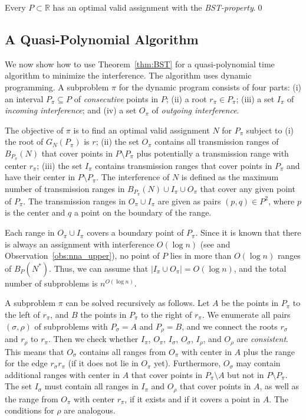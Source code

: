 \documentclass[envcountsect,envcountsame,runningheads,a4paper]{llncs}
\newcommand\R{{\mathbb R}}
\begin{document}
\begin{theorem}\label{thm:BST}
Every $P \subset \R$ has an optimal valid assignment
with the \emph{BST-property}.\qed
\end{theorem}

\subsection{A Quasi-Polynomial Algorithm}\label{sec:qalgo}

We now show how to use Theorem~\ref{thm:BST} for
a quasi-polynomial time algorithm to minimize the
interference. The algorithm uses dynamic
programming. A subproblem $\pi$ for the dynamic program consists of four
parts: (i) an interval $P_\pi \subseteq P$ of \emph{consecutive} points
in $P$;
(ii) a root $r_\pi \in P_\pi$; (iii) a set
$I_\pi$ of \emph{incoming interference}; and (iv) a set $O_\pi$
of \emph{outgoing interference}.

The objective of $\pi$ is to find an optimal valid assignment $N$ for
$P_\pi$ subject to
(i) the root of $G_N(P_\pi)$ is $r$;
(ii) the set $O_\pi$ contains all transmission ranges of
$B_{P_\pi}(N)$ that cover points in $P \setminus P_\pi$ plus potentially a
transmission range with center $r_\pi$;
(iii) the set $I_\pi$ contains
transmission ranges that cover points in $P_\pi$ and have their center in $P \setminus P_\pi$.
The interference of $N$ is defined as the maximum number of transmission ranges in
$B_{P_\pi}(N) \cup I_\pi \cup O_\pi$ that cover any given point of $P_\pi$.
The transmission ranges in $O_\pi \cup I_\pi$ are given as pairs $(p,q) \in P^2$, where
$p$ is the center and $q$ a point on the boundary of the range.

Each range in $O_\pi \cup I_\pi$ covers a boundary point of
$P_\pi$.
Since it is known that there is always an assignment with interference
$O(\log n)$ (see \cite{RickenbachWaZo09} and Observation~\ref{obs:nna_upper}),
no point of $P$ lies in more than $O(\log n)$
ranges of $B_P(N^*)$. Thus, we can assume that
$|I_\pi \cup O_\pi| = O(\log n)$, and the total number
of subproblems is $n^{O(\log n)}$.

A subproblem $\pi$ can be solved recursively as follows.
Let $A$ be the points in $P_\pi$ to the left of $r_\pi$,
and $B$ the points in $P_\pi$ to the right of $r_\pi$.
We enumerate all pairs $(\sigma, \rho)$ of subproblems with
$P_{\sigma} = A$ and $P_{\rho} = B$,
and we connect the roots $r_\sigma$ and $r_\rho$ to $r_\pi$.
Then we check whether $I_\pi$, $O_\pi$, $I_\sigma$, $O_\sigma$,
$I_\rho$, and $O_\rho$ are \emph{consistent}.
This means that  $O_\sigma$ contains all ranges from $O_\pi$ with center in
$A$ plus the range for the edge $r_\sigma r_\pi$
(if it does not lie in $O_\pi$ yet).
Furthermore,
$O_\sigma$ may contain additional ranges with center in $A$ that cover
points in $P_\pi \setminus A$ but not in $P \setminus P_\pi$.
The set $I_\sigma$ must contain all ranges in $I_\pi$ and $O_\rho$
that cover points in $A$, as
well as the range from $O_\pi$ with center $r_\pi$, if it exists and if it
covers a point in $A$.
The conditions for $\rho$ are analogous.
\end{document}
